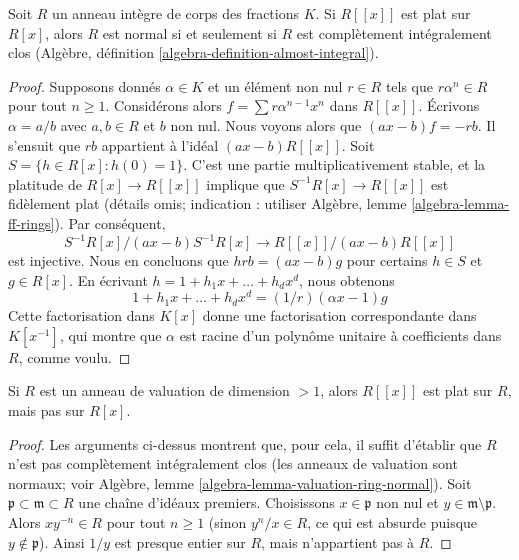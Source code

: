 \begin{lemma}
\label{lemma-almost-integral-when-powerseries-flat}
Soit $R$ un anneau intègre de corps des fractions $K$.
Si $R[[x]]$ est plat sur $R[x]$, alors $R$ est normal si et seulement
si $R$ est complètement intégralement clos
(Algèbre, définition \ref{algebra-definition-almost-integral}).
\end{lemma}

\begin{proof}
Supposons donnés $\alpha \in K$ et un élément non nul $r \in R$ tels que
$r \alpha^n \in R$ pour tout $n \geq 1$. Considérons alors
$f = \sum r \alpha^{n - 1} x^n$ dans $R[[x]]$. Écrivons $\alpha = a/b$
avec $a, b \in R$ et $b$ non nul. Nous voyons alors que $(a x - b)f = -rb$.
Il s'ensuit que $rb$ appartient à l'idéal $(ax - b)R[[x]]$.
Soit $S = \{h \in R[x] : h(0) = 1\}$. C'est une partie multiplicativement stable,
et la platitude de $R[x] \to R[[x]]$ implique que $S^{-1}R[x] \to R[[x]]$
est fidèlement plat (détails omis; indication : utiliser Algèbre, lemme
\ref{algebra-lemma-ff-rings}). Par conséquent,
$$
S^{-1}R[x]/(ax - b)S^{-1}R[x] \to R[[x]]/(ax - b)R[[x]]
$$
est injective. Nous en concluons que
$h rb = (ax - b) g$ pour certains $h \in S$ et $g \in R[x]$.
En écrivant $h = 1 + h_1 x + \ldots + h_d x^d$, nous obtenons
$$
1 + h_1 x + \ldots + h_d x^d = (1/r)(\alpha x - 1)g
$$
Cette factorisation dans $K[x]$ donne une factorisation correspondante
dans $K[x^{-1}]$, qui montre que $\alpha$ est racine d'un polynôme unitaire
à coefficients dans $R$, comme voulu.
\end{proof}

\begin{lemma}
\label{lemma-completion-polynomial-ring-not-flat-bis}
Si $R$ est un anneau de valuation de dimension $> 1$, alors $R[[x]]$
est plat sur $R$, mais pas sur $R[x]$.
\end{lemma}

\begin{proof}
Les arguments ci-dessus montrent que, pour cela, il suffit d'établir que
$R$ n'est pas complètement intégralement clos (les anneaux de valuation sont
normaux; voir Algèbre, lemme \ref{algebra-lemma-valuation-ring-normal}).
Soit $\mathfrak p \subset \mathfrak m \subset R$ une chaîne d'idéaux premiers.
Choisissons $x \in \mathfrak p$ non nul et $y \in \mathfrak m \setminus \mathfrak p$.
Alors $x y^{-n} \in R$ pour tout $n \geq 1$ (sinon $y^n/x \in R$,
ce qui est absurde puisque $y \not \in \mathfrak p$). Ainsi $1/y$ est
presque entier sur $R$, mais n'appartient pas à $R$.
\end{proof}

